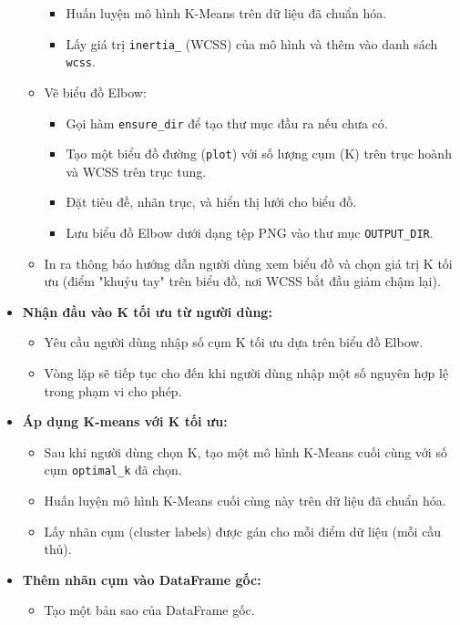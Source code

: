 \documentclass[12pt, a4paper]{report}
\begin{document}
\begin{itemize}
\begin{itemize}
\begin{itemize}
            \item Huấn luyện mô hình K-Means trên dữ liệu đã chuẩn hóa.
            \item Lấy giá trị \texttt{inertia\_} (WCSS) của mô hình và thêm vào danh sách \texttt{wcss}.
        \end{itemize}
        \item Vẽ biểu đồ Elbow:
        \begin{itemize}
            \item Gọi hàm \texttt{ensure\_dir} để tạo thư mục đầu ra nếu chưa có.
            \item Tạo một biểu đồ đường (\texttt{plot}) với số lượng cụm (K) trên trục hoành và WCSS trên trục tung.
            \item Đặt tiêu đề, nhãn trục, và hiển thị lưới cho biểu đồ.
            \item Lưu biểu đồ Elbow dưới dạng tệp PNG vào thư mục \texttt{OUTPUT\_DIR}.
        \end{itemize}
        \item In ra thông báo hướng dẫn người dùng xem biểu đồ và chọn giá trị K tối ưu (điểm "khuỷu tay" trên biểu đồ, nơi WCSS bắt đầu giảm chậm lại).
    \end{itemize}
    \item \textbf{Nhận đầu vào K tối ưu từ người dùng:}
    \begin{itemize}
        \item Yêu cầu người dùng nhập số cụm K tối ưu dựa trên biểu đồ Elbow.
        \item Vòng lặp sẽ tiếp tục cho đến khi người dùng nhập một số nguyên hợp lệ trong phạm vi cho phép.
    \end{itemize}
    \item \textbf{Áp dụng K-means với K tối ưu:}
    \begin{itemize}
        \item Sau khi người dùng chọn K, tạo một mô hình K-Means cuối cùng với số cụm \texttt{optimal\_k} đã chọn.
        \item Huấn luyện mô hình K-Means cuối cùng này trên dữ liệu đã chuẩn hóa.
        \item Lấy nhãn cụm (cluster labels) được gán cho mỗi điểm dữ liệu (mỗi cầu thủ).
    \end{itemize}
    \item \textbf{Thêm nhãn cụm vào DataFrame gốc:}
    \begin{itemize}
        \item Tạo một bản sao của DataFrame gốc.

\end{itemize}
\end{itemize}
\end{document}
